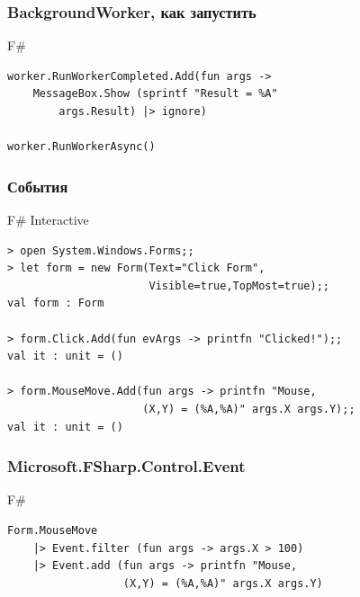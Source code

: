 \documentclass[xetex,mathserif,serif]{beamer}
\begin{document}
    \begin{frame}[fragile]
        \frametitle{BackgroundWorker, как запустить}
        \begin{exampleblock}{F\#}
            \begin{lstlisting}
worker.RunWorkerCompleted.Add(fun args ->
    MessageBox.Show (sprintf "Result = %A" 
        args.Result) |> ignore)

worker.RunWorkerAsync()
\end{lstlisting}
\end{exampleblock}
\end{frame}

    \begin{frame}[fragile]
        \frametitle{События}
        \begin{alertblock}{F\# Interactive}
            \begin{lstlisting}[keywordstyle=\color{black},emphstyle=\color{black}]
> open System.Windows.Forms;;
> let form = new Form(Text="Click Form",  
                      Visible=true,TopMost=true);;
val form : Form

> form.Click.Add(fun evArgs -> printfn "Clicked!");;
val it : unit = ()

> form.MouseMove.Add(fun args -> printfn "Mouse, 
                     (X,Y) = (%A,%A)" args.X args.Y);;
val it : unit = ()
\end{lstlisting}
\end{alertblock}
\end{frame}

    \begin{frame}[fragile]
        \frametitle{Microsoft.FSharp.Control.Event}
        \begin{exampleblock}{F\#}
            \begin{lstlisting}
Form.MouseMove
    |> Event.filter (fun args -> args.X > 100)
    |> Event.add (fun args -> printfn "Mouse, 
                  (X,Y) = (%A,%A)" args.X args.Y)
\end{lstlisting}
\end{exampleblock}
\end{frame}
\end{document}
